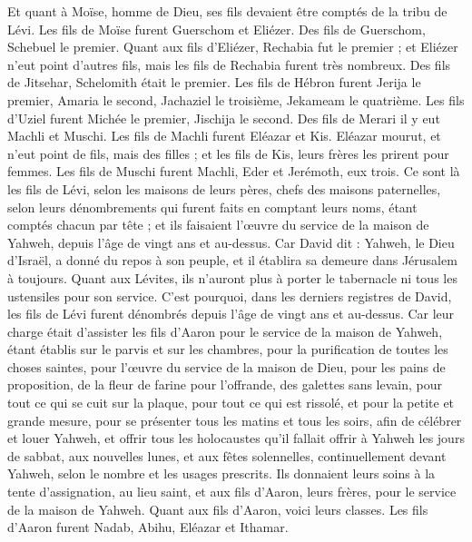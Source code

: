 \begin{multicols}{2}
Et quant à Moïse, homme de Dieu, ses fils devaient être comptés de la tribu de Lévi.
Les fils de Moïse furent Guerschom et Eliézer.
Des fils de Guerschom, Schebuel le premier.
Quant aux fils d'Eliézer, Rechabia fut le premier ; et Eliézer n'eut point d'autres fils, mais les fils de Rechabia furent très nombreux.
Des fils de Jitsehar, Schelomith était le premier.
Les fils de Hébron furent Jerija le premier, Amaria le second, Jachaziel le troisième, Jekameam le quatrième.
Les fils d'Uziel furent Michée le premier, Jischija le second.
Des fils de Merari il y eut Machli et Muschi. Les fils de Machli furent Eléazar et Kis.
Eléazar mourut, et n'eut point de fils, mais des filles ; et les fils de Kis, leurs frères les prirent pour femmes.
Les fils de Muschi furent Machli, Eder et Jerémoth, eux trois.
Ce sont là les fils de Lévi, selon les maisons de leurs pères, chefs des maisons paternelles, selon leurs dénombrements qui furent faits en comptant leurs noms, étant comptés chacun par tête ; et ils faisaient l'œuvre du service de la maison de Yahweh, depuis l'âge de vingt ans et au-dessus.
Car David dit : Yahweh, le Dieu d'Israël, a donné du repos à son peuple, et il établira sa demeure dans Jérusalem à toujours.
Quant aux Lévites, ils n'auront plus à porter le tabernacle ni tous les ustensiles pour son service.
C'est pourquoi, dans les derniers registres de David, les fils de Lévi furent dénombrés depuis l'âge de vingt ans et au-dessus.
Car leur charge était d'assister les fils d'Aaron pour le service de la maison de Yahweh, étant établis sur le parvis et sur les chambres, pour la purification de toutes les choses saintes, pour l'œuvre du service de la maison de Dieu,
pour les pains de proposition, de la fleur de farine pour l'offrande, des galettes sans levain, pour tout ce qui se cuit sur la plaque, pour tout ce qui est rissolé, et pour la petite et grande mesure,
pour se présenter tous les matins et tous les soirs, afin de célébrer et louer Yahweh,
et offrir tous les holocaustes qu'il fallait offrir à Yahweh les jours de sabbat, aux nouvelles lunes, et aux fêtes solennelles, continuellement devant Yahweh, selon le nombre et les usages prescrits.
Ils donnaient leurs soins à la tente d'assignation, au lieu saint, et aux fils d'Aaron, leurs frères, pour le service de la maison de Yahweh.
\VerseOne{}Quant aux fils d'Aaron, voici leurs classes. Les fils d'Aaron furent Nadab, Abihu, Eléazar et Ithamar.

\end{multicols}
